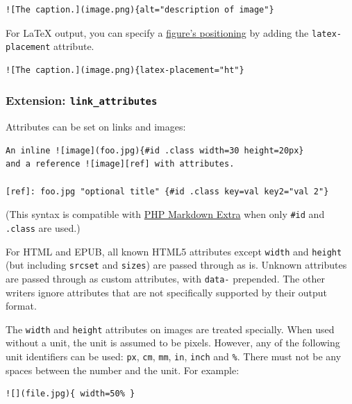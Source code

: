 \documentclass[
]{article}
\begin{document}
\begin{verbatim}
![The caption.](image.png){alt="description of image"}
\end{verbatim}

For LaTeX output, you can specify a
\href{https://www.overleaf.com/learn/latex/Positioning_images_and_tables\#The_figure_environment}{figure's
positioning} by adding the \texttt{latex-placement} attribute.

\begin{verbatim}
![The caption.](image.png){latex-placement="ht"}
\end{verbatim}

\hypertarget{extension-link_attributes}{%
\subsubsection{\texorpdfstring{Extension:
\texttt{link\_attributes}}{Extension: link\_attributes}}\label{extension-link_attributes}}

Attributes can be set on links and images:

\begin{verbatim}
An inline ![image](foo.jpg){#id .class width=30 height=20px}
and a reference ![image][ref] with attributes.

[ref]: foo.jpg "optional title" {#id .class key=val key2="val 2"}
\end{verbatim}

(This syntax is compatible with
\href{https://michelf.ca/projects/php-markdown/extra/}{PHP Markdown
Extra} when only \texttt{\#id} and \texttt{.class} are used.)

For HTML and EPUB, all known HTML5 attributes except \texttt{width} and
\texttt{height} (but including \texttt{srcset} and \texttt{sizes}) are
passed through as is. Unknown attributes are passed through as custom
attributes, with \texttt{data-} prepended. The other writers ignore
attributes that are not specifically supported by their output format.

The \texttt{width} and \texttt{height} attributes on images are treated
specially. When used without a unit, the unit is assumed to be pixels.
However, any of the following unit identifiers can be used: \texttt{px},
\texttt{cm}, \texttt{mm}, \texttt{in}, \texttt{inch} and \texttt{\%}.
There must not be any spaces between the number and the unit. For
example:

\begin{verbatim}
![](file.jpg){ width=50% }
\end{verbatim}
\end{document}
